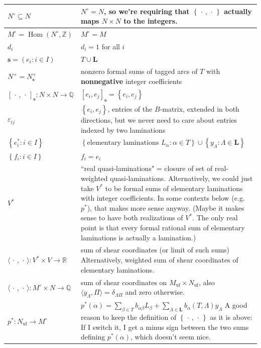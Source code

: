 \documentclass{amsart}
\theoremstyle{definition}
\theoremstyle{remark}
\numberwithin{equation}{section}
\newcommand{\integers}{\mathbb Z}
\newcommand{\rationals}{\mathbb Q}
\newcommand{\reals}{\mathbb R}
\newcommand{\ep}{\varepsilon}
\newcommand{\uf}{{\operatorname{uf}}}
\newcommand{\set}[1]{{\left\lbrace #1 \right\rbrace}}
\newcommand{\br}[1]{{\langle #1 \rangle}}
\newcommand{\0}{{\mathbf{0}}}
\newcommand{\s}{\mathbf{s}}
\renewcommand{\L}{\mathbf{L}}
\newcommand{\Hom}{\operatorname{Hom}}
\begin{document}
\begin{longtable}{P{88.5pt}|P{248pt}}
\\\hline
$N^\circ\subseteq N$&$N^\circ=N$, so we're requiring that $\set{\,\cdot\,,\,\cdot\,}$ actually maps $N\times N$ to the integers.\\\hline
$M^\circ=\Hom(N^\circ,\integers)$&$M^\circ=M$\\\hline
$d_i$&$d_i=1$ for all $i$\\\hline
$\s=(e_i:i\in I)$&$T\cup\L$\\\hline
$N^+=N^+_\s$& nonzero formal sums of tagged arcs of $T$ with \textbf{nonnegative} integer coefficients\\\hline
$[\,\cdot\,,\,\cdot\,]_\s:N\times N\to\rationals$&$[e_i,e_j]_\s=\set{e_i,e_j}$\\\hline
$\ep_{ij}$&$\set{e_i,e_j}$, entries of the $B$-matrix, extended in both directions, but we never need to care about entries indexed by two laminations\\\hline
$\set{e^*_i:i\in I}$&$\set{\text{elementary laminations }L_\alpha:\alpha\in T}\cup\set{y_\Lambda:\Lambda\in\L}$\\\hline
$\set{f_i:i\in I}$&$f_i=e_i$\\\hline
$V^*$&``real quasi-laminations" = closure of set of real-weighted quasi-laminations. \linebreak
Alternatively, we could just take $V^*$ to be formal sums of elementary laminations with integer coefficients.  In some contexts below (e.g.\ $p^*$), that makes more sense anyway.  (Maybe it makes sense to have both realizations of $V^*$.  The only real point is that every formal rational sum of elementary laminations is actually a lamination.)\\\hline
$\br{\,\cdot\,,\,\cdot\,}:V^*\times V\to\reals$& sum of shear coordinates (or limit of such sums)\newline
Alternatively, weighted sum of shear coordinates of elementary laminations.  \\\hline
$\br{\,\cdot\,,\,\cdot\,}:M^\circ\times N\to\rationals$&sum of shear coordinates on $M_\uf\times N_\uf$, also $\br{y_\Lambda,\Pi}=\delta_{\Lambda\Pi}$ and zero otherwise.
\\\hline
$p^*:N_\uf\to M^\circ$&
$p^*(\alpha)=\sum_{\beta\in T}b_{\alpha\beta}L_\beta+\sum_{\Lambda\in\L}b_\alpha(T,\Lambda)y_\Lambda$\linebreak
A good reason to keep the definition of $\set{\,\cdot\,,\,\cdot\,}$ as it is above:  If I switch it, I get a minus sign between the two sums defining $p^*(\alpha)$, which doesn't seem nice.\newline 

\end{longtable}
\end{document}
